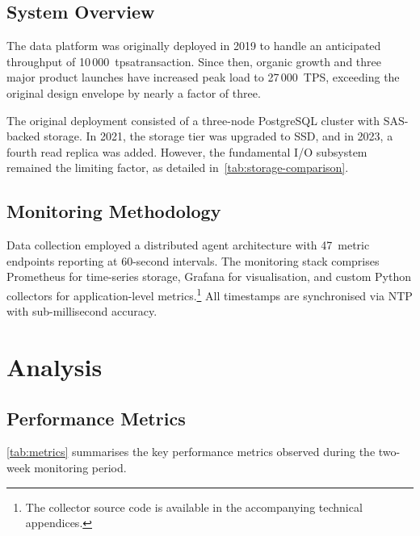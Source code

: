 \documentclass[
    language=english,
    doctype=technical-report,
    institution=none,
    titlestyle=book,
    oneside,
    loadGlossaries,
]{../../omnilatex}
\begin{document}
\section{System Overview}

The data platform was originally deployed in 2019 to handle an
anticipated \gls{throughput} of 10\,000~\gls{tpsatransaction}. Since
then, organic growth and three major product launches have increased peak
load to 27\,000~TPS, exceeding the original design envelope by nearly a
factor of three.

The original deployment consisted of a three-node PostgreSQL cluster with
SAS-backed storage. In 2021, the storage tier was upgraded to SSD, and in
2023, a fourth read replica was added. However, the fundamental I/O
subsystem remained the limiting factor, as detailed
in~\cref{tab:storage-comparison}.

\section{Monitoring Methodology}
\label{sec:monitoring}

Data collection employed a distributed agent architecture with 47~metric
endpoints reporting at 60-second intervals. The monitoring stack
comprises Prometheus for time-series storage, Grafana for visualisation,
and custom Python collectors for application-level
metrics.\footnote{The collector source code is available in the
accompanying technical appendices.} All timestamps are synchronised via
NTP with sub-millisecond accuracy.

\chapter{Analysis}

\section{Performance Metrics}

\cref{tab:metrics} summarises the key performance metrics observed during
the two-week monitoring period.
\end{document}
